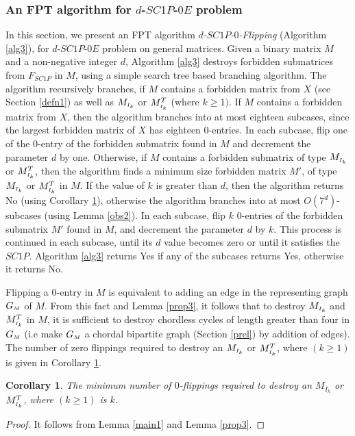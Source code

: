 \documentclass[review, 1p]{elsarticle}
\newtheorem{corollary}{Corollary}
\begin{document}
\subsubsection{\textup{\textbf{An FPT algorithm for $d$-$SC1P$-$0E$ problem}}} \label{fpt0e}
In this section, we present an FPT algorithm \textit{$d$-$SC1P$-$0$-Flipping} (Algorithm \ref{alg3}), for $d$-$SC1P$-$0E$ problem on general matrices. Given a binary matrix $M$ and a non-negative integer $d$, Algorithm \ref{alg3} destroys forbidden submatrices from $F_{SC1P}$ in $M$, using a simple search tree based branching algorithm. The algorithm recursively branches, if $M$ contains a forbidden matrix from $X$ (see Section \ref{defn1}) as well as $M_{\mathsmaller I_{k}}$ or $M^{T}_{\mathsmaller I_{k}}$ (where $k \geq 1)$. If $M$ contains a forbidden matrix from $X$, then the algorithm branches into at most eighteen subcases, since the largest forbidden matrix of $X$ has eighteen $0$-entries. In each subcase, flip one of the $0$-entry of the forbidden submatrix found in $M$ and decrement the parameter $d$ by one. Otherwise, if $M$ contains a forbidden submatrix of type $M_{\mathsmaller I_{k}}$ or $M^{T}_{\mathsmaller I_{k}}$, then the algorithm finds a minimum size forbidden matrix $M'$, of type $M_{\mathsmaller I_{k}}$ or $M^{T}_{\mathsmaller I_{k}}$ in $M$. If the value of $k$ is greater than $d$, then the algorithm returns No (using Corollary \ref{prp3}), otherwise the algorithm branches into at most $O(7^{d})$-subcases (using Lemma \ref{obs2}). In each subcase, flip $k$ $0$-entries of the forbidden submatrix $M'$ found in $M$, and decrement the parameter $d$ by $k$. This process is continued in each subcase, until its $d$ value becomes zero or until it satisfies the $SC1P$. Algorithm \ref{alg3} returns Yes if any of the subcases returns Yes, otherwise it returns No. 

Flipping a $0$-entry in $M$ is equivalent to adding an edge in the representing graph $G_{\mathsmaller{M}}$ of $M$. From this fact and Lemma \ref{prop3}, it follows that to destroy $M_{\mathsmaller I_{k}}$ and $M^{T}_{\mathsmaller I_{k}}$ in $M$, it is sufficient to destroy chordless cycles of length greater than four in $G_{\mathsmaller{M}}$ (i.e make $G_{\mathsmaller{M}}$ a chordal bipartite graph (Section \ref{prel}) by addition of edges). The number of zero flippings required to destroy an $M_{\mathsmaller I_{k}}$ or $M^{T}_{\mathsmaller I_{k}}$, where $(k \geq 1)$ is given in Corollary \ref{prp3}.
\begin{corollary}\label{prp3}
The minimum number of $0$-flippings required to destroy an $M_{I_{k}}$ or $M^{T}_{\mathsmaller I_{k}}$, where $(k \geq 1)$ is $k$.
\end{corollary}
\begin{proof}
It follows from Lemma \ref{main1} and Lemma \ref{prop3}.
\end{proof}
\end{document}
